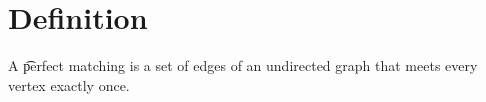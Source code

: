 

\section*{Definition}

A \t{perfect matching} is a set of edges of an undirected graph that meets every vertex exactly once.

\blankpage